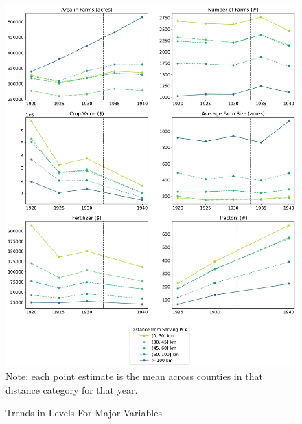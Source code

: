 \documentclass[12pt]{article}
\begin{document}
\begin{figure}
    \centering
    \caption{Trends in Levels For Major Variables}
    \label{trend_vars}
\includegraphics[width=1\textwidth]{trends_levels.pdf} \\
\footnotesize Note: each point estimate is the mean across counties in that distance category for that year.
\end{figure}
\end{document}
